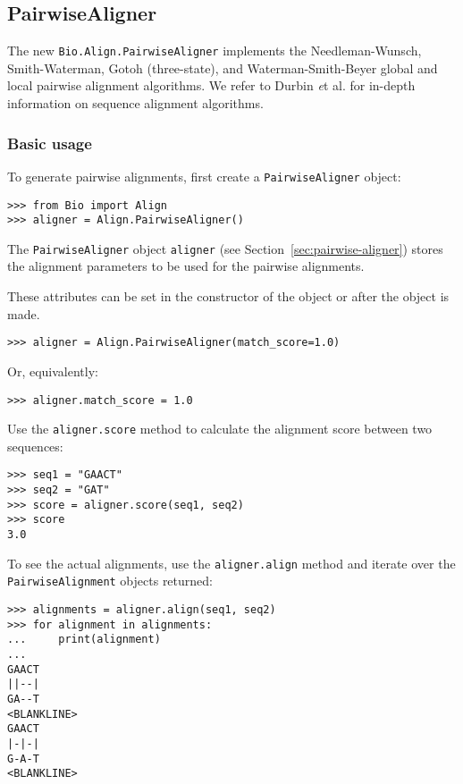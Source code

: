 \subsection{PairwiseAligner}
\label{sec:pairwisealigner}
The new \verb|Bio.Align.PairwiseAligner| implements the Needleman-Wunsch, Smith-Waterman,
Gotoh (three-state), and Waterman-Smith-Beyer global and local pairwise alignment algorithms.
We refer to Durbin {\textit et al.} \cite{durbin1998} for in-depth information on sequence alignment algorithms.

\subsubsection{Basic usage}
\label{sec:pairwise-basic}

To generate pairwise alignments, first create a \verb+PairwiseAligner+ object:

\begin{verbatim}
>>> from Bio import Align
>>> aligner = Align.PairwiseAligner()
\end{verbatim}
The \verb+PairwiseAligner+ object \verb+aligner+
(see Section~\ref{sec:pairwise-aligner})
stores the alignment parameters to be used for the pairwise alignments.

These attributes can be set in the constructor of the object or after the object
is made.

\begin{verbatim}
>>> aligner = Align.PairwiseAligner(match_score=1.0)
\end{verbatim}

Or, equivalently:

\begin{verbatim}
>>> aligner.match_score = 1.0
\end{verbatim}

Use the \verb+aligner.score+ method to calculate the alignment score between
two sequences:

\begin{verbatim}
>>> seq1 = "GAACT"
>>> seq2 = "GAT"
>>> score = aligner.score(seq1, seq2)
>>> score
3.0
\end{verbatim}

To see the actual alignments, use the \verb+aligner.align+ method and iterate over the \verb+PairwiseAlignment+ objects returned:

\begin{verbatim}
>>> alignments = aligner.align(seq1, seq2)
>>> for alignment in alignments:
...     print(alignment)
... 
GAACT
||--|
GA--T
<BLANKLINE>
GAACT
|-|-|
G-A-T
<BLANKLINE>
\end{verbatim}

